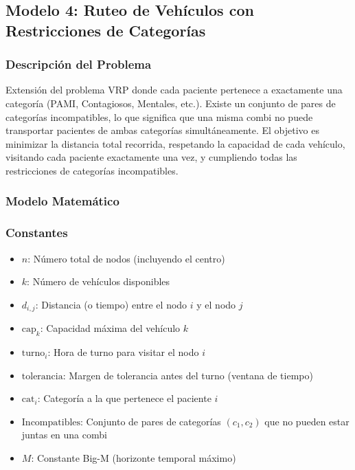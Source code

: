 \documentclass[12pt]{article}
\begin{document}
\subsection{Modelo 4: Ruteo de Vehículos con Restricciones de Categorías}

\subsubsection{Descripción del Problema}

Extensión del problema VRP donde cada paciente pertenece a exactamente una categoría (PAMI, Contagiosos, Mentales, etc.). Existe un conjunto de pares de categorías incompatibles, lo que significa que una misma combi no puede transportar pacientes de ambas categorías simultáneamente. El objetivo es minimizar la distancia total recorrida, respetando la capacidad de cada vehículo, visitando cada paciente exactamente una vez, y cumpliendo todas las restricciones de categorías incompatibles.

\subsubsection{Modelo Matemático}

\subsubsection*{Constantes}

\begin{itemize}
    \item $n$: Número total de nodos (incluyendo el centro)
    \item $k$: Número de vehículos disponibles
    \item $d_{i,j}$: Distancia (o tiempo) entre el nodo $i$ y el nodo $j$
    \item $\text{cap}_k$: Capacidad máxima del vehículo $k$
    \item $\text{turno}_i$: Hora de turno para visitar el nodo $i$
    \item $\text{tolerancia}$: Margen de tolerancia antes del turno (ventana de tiempo)
    \item $\text{cat}_i$: Categoría a la que pertenece el paciente $i$
    \item $\text{Incompatibles}$: Conjunto de pares de categorías $(c_1, c_2)$ que no pueden estar juntas en una combi
    \item $M$: Constante Big-M (horizonte temporal máximo)
\end{itemize}
\end{document}
